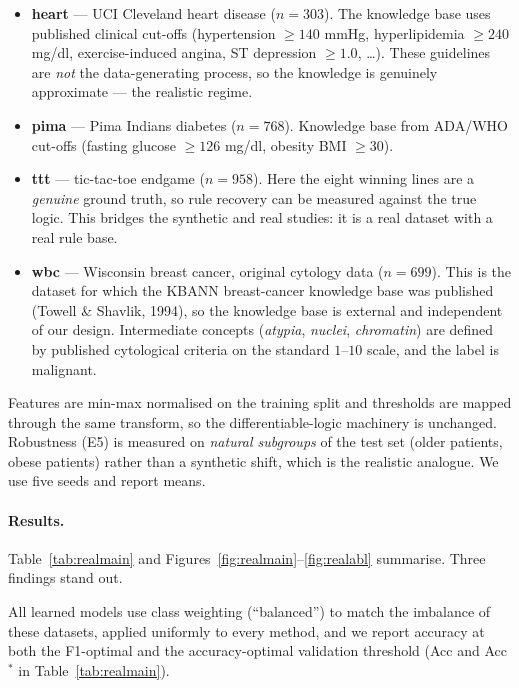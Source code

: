 \documentclass[11pt]{article}
\begin{document}
\begin{itemize}
  \item \textbf{heart} --- UCI Cleveland heart disease ($n{=}303$). The knowledge
  base uses published clinical cut-offs (hypertension $\ge 140$ mmHg,
  hyperlipidemia $\ge 240$ mg/dl, exercise-induced angina, ST depression
  $\ge 1.0$, \dots). These guidelines are \emph{not} the data-generating process,
  so the knowledge is genuinely approximate --- the realistic regime.
  \item \textbf{pima} --- Pima Indians diabetes ($n{=}768$). Knowledge base from
  ADA/WHO cut-offs (fasting glucose $\ge 126$ mg/dl, obesity BMI $\ge 30$).
  \item \textbf{ttt} --- tic-tac-toe endgame ($n{=}958$). Here the eight winning
  lines are a \emph{genuine} ground truth, so rule recovery can be measured
  against the true logic. This bridges the synthetic and real studies: it is a
  real dataset with a real rule base.
  \item \textbf{wbc} --- Wisconsin breast cancer, original cytology data
  ($n{=}699$). This is the dataset for which the KBANN breast-cancer knowledge
  base was published (Towell \& Shavlik, 1994), so the knowledge base is external
  and independent of our design. Intermediate concepts (\emph{atypia},
  \emph{nuclei}, \emph{chromatin}) are defined by published cytological criteria
  on the standard $1$--$10$ scale, and the label is malignant.
\end{itemize}

Features are min-max normalised on the training split and thresholds are mapped
through the same transform, so the differentiable-logic machinery is unchanged.
Robustness (E5) is measured on \emph{natural subgroups} of the test set (older
patients, obese patients) rather than a synthetic shift, which is the realistic
analogue. We use five seeds and report means.

\paragraph{Results.}
Table~\ref{tab:realmain} and Figures~\ref{fig:realmain}--\ref{fig:realabl}
summarise. Three findings stand out.

All learned models use class weighting (``balanced'') to match the imbalance of
these datasets, applied uniformly to every method, and we report accuracy at both
the F1-optimal and the accuracy-optimal validation threshold (Acc and Acc$^\ast$
in Table~\ref{tab:realmain}).
\end{document}
